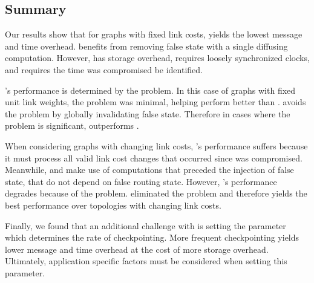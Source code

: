 \subsection{Summary}
\label{subsec:discuss}

Our results show that for graphs with fixed link costs, \cpr yields the lowest message and time overhead. \cpr benefits from removing false state with a single
diffusing computation. However, \cpr has storage overhead, requires loosely synchronized clocks, and requires the time \bad was compromised be identified.

\seconds's performance is determined by the \infinity problem. In this case of \er graphs with fixed unit link weights, the \infinity problem was minimal, 
helping \second perform better than \purges. \purge avoids the \infinity problem by globally invalidating false state.  Therefore in cases where the \infinity problem is 
significant, \purge outperforms \seconds.

When considering graphs with changing link costs, \cprs's performance suffers because it must process all valid link cost changes that occurred since \bad was compromised.
Meanwhile, \second and \purge make use of computations that preceded the injection of false state, that do not depend on false routing state. However, \seconds's performance degrades 
because of the \infinity problem.  \purge eliminated the \infinity problem and therefore yields the best performance over topologies with changing link costs.

Finally, we found that an additional challenge with \cpr is setting the parameter which determines the rate of checkpointing. 
More frequent checkpointing yields lower message and time overhead at the cost of more storage overhead. Ultimately, application specific factors must be considered
when setting this parameter. 

